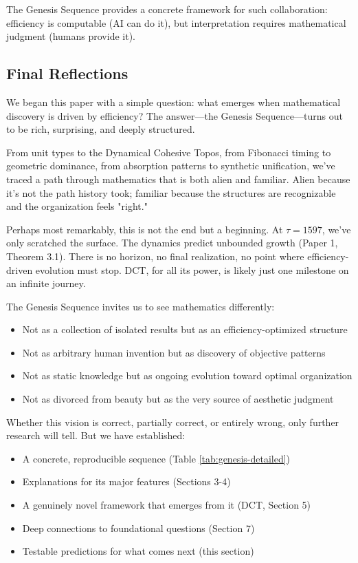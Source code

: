 \documentclass[11pt]{article}
\theoremstyle{definition}
\begin{document}
The Genesis Sequence provides a concrete framework for such collaboration: efficiency is computable (AI can do it), but interpretation requires mathematical judgment (humans provide it).

\subsection{Final Reflections}

We began this paper with a simple question: what emerges when mathematical discovery is driven by efficiency? The answer—the Genesis Sequence—turns out to be rich, surprising, and deeply structured.

From unit types to the Dynamical Cohesive Topos, from Fibonacci timing to geometric dominance, from absorption patterns to synthetic unification, we've traced a path through mathematics that is both alien and familiar. Alien because it's not the path history took; familiar because the structures are recognizable and the organization feels "right."

Perhaps most remarkably, this is not the end but a beginning. At $\tau=1597$, we've only scratched the surface. The dynamics predict unbounded growth (Paper 1, Theorem 3.1). There is no horizon, no final realization, no point where efficiency-driven evolution must stop. DCT, for all its power, is likely just one milestone on an infinite journey.

The Genesis Sequence invites us to see mathematics differently:
\begin{itemize}
\item Not as a collection of isolated results but as an efficiency-optimized structure
\item Not as arbitrary human invention but as discovery of objective patterns
\item Not as static knowledge but as ongoing evolution toward optimal organization
\item Not as divorced from beauty but as the very source of aesthetic judgment
\end{itemize}

Whether this vision is correct, partially correct, or entirely wrong, only further research will tell. But we have established:
\begin{itemize}
\item A concrete, reproducible sequence (Table \ref{tab:genesis-detailed})
\item Explanations for its major features (Sections 3-4)
\item A genuinely novel framework that emerges from it (DCT, Section 5)
\item Deep connections to foundational questions (Section 7)
\item Testable predictions for what comes next (this section)
\end{itemize}
\end{document}
